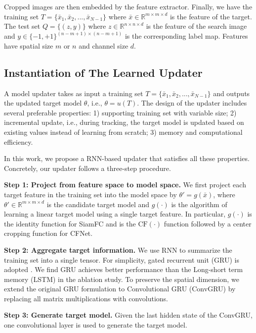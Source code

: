 \documentclass[journal]{IEEEtran}
\begin{document}
Cropped images are then embedded by the feature extractor. Finally, we have the training set $T = \{\bar{x}_1, \bar{x}_2, ..., \bar{x}_{N-1}\}$ where $\bar{x} \in \mathbb{R}^{m\times m \times d}$ is the feature of the target. The test set $Q = \{(z, y)\}$ where $z \in \mathbb{R}^{n\times n \times d}$ is the feature of the search image and $y\in \{-1, +1\}^{(n - m + 1)\times (n - m + 1)}$ is the corresponding label map.
Features have spatial size $m$ or $n$ and channel size $d$.

\subsection{Instantiation of The Learned Updater}
A model updater takes as input a training set $T = \{\bar{x}_1, \bar{x}_2, ..., \bar{x}_{N-1}\}$ and outputs the updated target model $\theta$, i.e., $\theta = u(T)$. The design of the updater includes several preferable properties: 1) supporting training set with variable size; 2) incremental update, i.e., during tracking, the target model is updated based on existing values instead of learning from scratch; 3) memory and computational efficiency.

In this work, we propose a RNN-based updater that satisfies all these properties. Concretely, our updater follows a three-step procedure.

\textbf{Step 1: Project from feature space to model space.} We first project each target feature in the training set into the model space by $\theta' = g(\bar{x})$, 
where $\theta' \in \mathbb{R}^{m\times m \times d}$ is the candidate target model and $g(\cdot)$ is the algorithm of learning a linear target model using a single target feature. In particular, $g(\cdot)$ is the identity function for SiamFC and is the $\mathrm{CF}(\cdot)$ function followed by a center cropping function for CFNet.

\textbf{Step 2: Aggregate target information.} We use RNN to summarize the training set into a single tensor. For simplicity, gated recurrent unit (GRU) is adopted \cite{cho2014learning}. We find GRU achieves better performance than the Long-short term memory (LSTM\cite{hochreiter1997long}) in the ablation study. To preserve the spatial dimension, we extend the original GRU formulation to Convolutional GRU (ConvGRU) by replacing all matrix multiplications with convolutions.

\textbf{Step 3: Generate target model.} Given the last hidden state of the ConvGRU, one convolutional layer is used to generate the target model.
\end{document}
